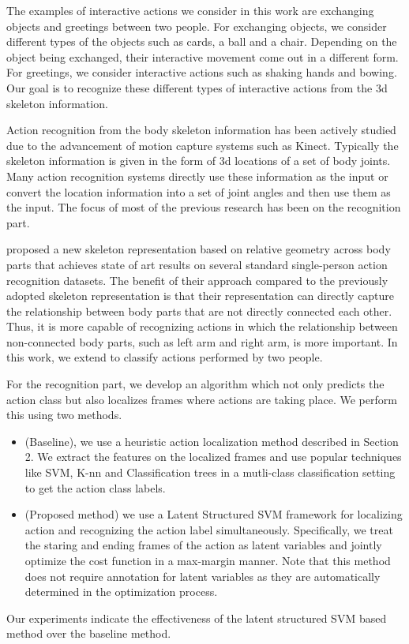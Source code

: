 \documentclass[10pt,twocolumn,letterpaper]{article}
\begin{document}
The examples of interactive actions we consider in this work are exchanging objects and greetings between two people. For exchanging objects, we consider different types of the objects such as cards, a ball and a chair. Depending on the object being exchanged, their interactive movement come out in a different form. For greetings, we consider interactive actions such as shaking hands and bowing. Our goal is to recognize these different types of interactive actions from the 3d skeleton information.


Action recognition from the body skeleton information has been actively studied due to the advancement of motion capture systems such as Kinect. Typically the skeleton information is given in the form of 3d locations of a set of body joints. Many action recognition systems directly use these information as the input or convert the location information into a set of joint angles and then use them as the input. The focus of most of the previous research has been on the recognition part. 

\cite{Vemulapalli2013} proposed a new skeleton representation based on relative geometry across body parts that achieves state of art results on several standard single-person action recognition datasets. The benefit of their approach compared to the previously adopted skeleton representation is that their representation can directly capture the relationship between body parts that are not directly connected each other. Thus, it is more capable of recognizing actions in which the relationship between non-connected body parts, such as left arm and right arm, is more important. In this work, we extend \cite{Vemulapalli2013} to classify actions performed by two people.


For the recognition part, we develop an algorithm which not only predicts the action class but also localizes frames where actions are taking place. We perform this using two methods.
\begin{itemize}
\item (Baseline), we use a heuristic action localization method described in Section 2. We extract the features on the localized frames and use popular techniques like SVM, K-nn and Classification trees in a mutli-class classification setting to get the action class labels. 
\item (Proposed method) we use a Latent Structured SVM framework for localizing action and recognizing the action label simultaneously. Specifically, we treat the staring and ending frames of the action as latent variables and jointly optimize the cost function in a max-margin manner. Note that this method does not require annotation for latent variables as they are automatically determined in the optimization process.
\end{itemize}
 Our experiments indicate the effectiveness of the latent structured SVM based method over the baseline method.
\end{document}
